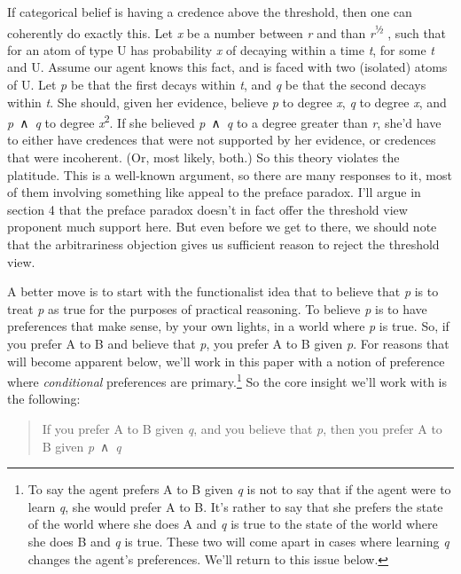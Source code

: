 \documentclass[
  11pt,
  letterpaper,
  DIV=11,
  numbers=noendperiod,
  twoside]{scrartcl}
\begin{document}
If categorical belief is having a credence above the threshold, then one
can coherently do exactly this. Let \emph{x} be a number between
\emph{r} and than \emph{r}\textsuperscript{½} , such that for an atom of
type U has probability \emph{x} of decaying within a time \emph{t}, for
some \emph{t} and U. Assume our agent knows this fact, and is faced with
two (isolated) atoms of U. Let \emph{p} be that the first decays within
\emph{t}, and \emph{q} be that the second decays within \emph{t}. She
should, given her evidence, believe \emph{p} to degree \emph{x},
\emph{q} to degree \emph{x}, and \emph{p}~∧~\emph{q} to degree
\emph{x}\textsuperscript{2}. If she believed \emph{p}~∧~\emph{q} to a
degree greater than \emph{r}, she'd have to either have credences that
were not supported by her evidence, or credences that were incoherent.
(Or, most likely, both.) So this theory violates the platitude. This is
a well-known argument, so there are many responses to it, most of them
involving something like appeal to the preface paradox. I'll argue in
section 4 that the preface paradox doesn't in fact offer the threshold
view proponent much support here. But even before we get to there, we
should note that the arbitrariness objection gives us sufficient reason
to reject the threshold view.

A better move is to start with the functionalist idea that to believe
that \emph{p} is to treat \emph{p} as true for the purposes of practical
reasoning. To believe \emph{p} is to have preferences that make sense,
by your own lights, in a world where \emph{p} is true. So, if you prefer
A to B and believe that \emph{p}, you prefer A to B given \emph{p}. For
reasons that will become apparent below, we'll work in this paper with a
notion of preference where \emph{conditional} preferences are
primary.\footnote{To say the agent prefers A to B given \emph{q} is not
  to say that if the agent were to learn \emph{q}, she would prefer A to
  B. It's rather to say that she prefers the state of the world where
  she does A and \emph{q} is true to the state of the world where she
  does B and \emph{q} is true. These two will come apart in cases where
  learning \emph{q} changes the agent's preferences. We'll return to
  this issue below.} So the core insight we'll work with is the
following:

\begin{quote}
If you prefer A to B given \emph{q}, and you believe that \emph{p}, then
you prefer A to B given \emph{p}~∧~\emph{q}
\end{quote}
\end{document}

